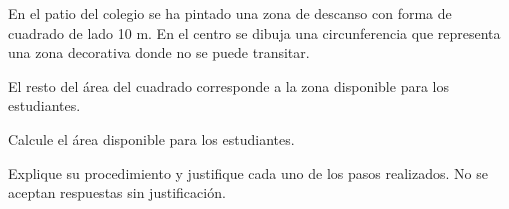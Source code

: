 En el patio del colegio se ha pintado una zona de descanso con forma de cuadrado de lado 10 m. En el centro se dibuja una circunferencia que representa una zona decorativa donde no se puede transitar.

El resto del área del cuadrado corresponde a la zona disponible para los estudiantes.

\begin{center}
\end{center}

Calcule el área disponible para los estudiantes.

Explique su procedimiento y justifique cada uno de los pasos realizados. No se aceptan respuestas sin justificación.